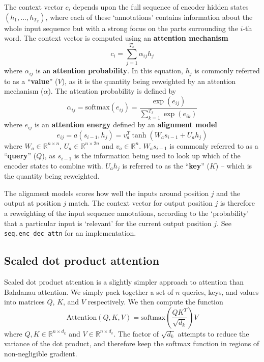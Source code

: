 \documentclass[11pt]{article}
\numberwithin{equation}{section}
\begin{document}
The context vector $c_i$ depends upon the full sequence of encoder hidden states $(h_1, ..., h_{T_x})$, where each of these `annotations' contains information about the whole input sequence but with a strong focus on the parts surrounding the $i$-th word. The context vector is computed using an \textbf{attention mechanism}
\begin{equation}
c_i = \sum_{j=1}^{T_x} \alpha_{ij} h_j \label{eq:bah-attn-mech}
\end{equation}
where $\alpha_{ij}$ is an \textbf{attention probability}. In this equation, $h_j$ is commonly referred to as a ``\textbf{value}'' ($V$), as it is the quantity being reweighted by an attention mechanism ($\alpha$). The attention probability is defined by
\begin{equation}
\alpha_{ij} = \text{softmax}\left( e_{ij} \right) = \frac{\exp(e_{ij})}{\sum_{k=1}^{T_x}\exp(e_{ik})}
\end{equation}
where $e_{ij}$ is an \textbf{attention energy} defined by an \textbf{alignment model}
\begin{equation}
e_{ij} = a(s_{i-1}, h_j) = v_a^T \tanh(W_a s_{i-1} + U_a h_j)
\end{equation}
where $W_a \in \mathbb{R}^{n \times n}$, $U_a \in \mathbb{R}^{n \times 2n}$ and $v_a \in \mathbb{R}^n$. $W_a s_{i-1}$ is commonly referred to as a ``\textbf{query}'' ($Q$), as $s_{i-1}$ is the information being used to look up which of the encoder states to combine with. $U_a h_j$ is referred to as the ``\textbf{key}'' ($K$) -- which is the quantity being reweighted.

The alignment models scores how well the inputs around position $j$ and the output at position $j$ match. The context vector for output position $j$ is therefore a reweighting of the input sequence annotations, according to the `probability' that a particular input is `relevant' for the current output position $j$. See \verb#seq.enc_dec_attn# for an implementation.

\subsection{Scaled dot product attention} \label{sec:dp-attn}
Scaled dot product attention is a slightly simpler approach to attention than Bahdanau attention. We simply pack together a set of $n$ queries, keys, and values into matrices $Q$, $K$, and $V$ respectively. We then compute the function
\begin{equation}
\text{Attention}(Q, K, V) = \text{softmax}\left( \frac{QK^T}{\sqrt{d_k}} \right) V
\end{equation}
where $Q, K \in \mathbb{R}^{n \times d_k}$ and $V \in \mathbb{R}^{n \times d_v}$. The factor of $\sqrt{d_k}$ attempts to reduce the variance of the dot product, and therefore keep the softmax function in regions of non-negligible gradient.
\end{document}
